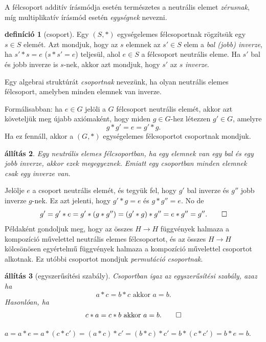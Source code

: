 \documentclass[a4paper, showtrims]{memoir}
\makeatletter
\renewenvironment{proof}[1][\proofname]
    {\par\pushQED{\qed}%
    \normalfont \topsep6\p@\@plus6\p@\relax
    \trivlist
    \item[\hskip\labelsep
        \itshape
    #1\@addpunct{:}]\ignorespaces}
    {\popQED\endtrivlist\@endpefalse}
\theoremstyle{plain}
\newtheorem{proposition}{állítás}[chapter]
\theoremstyle{remark}
\theoremstyle{definition}
\newtheorem{definition}[proposition]{definíció}
\makeatother
\begin{document}
A félcsoport additív írásmódja esetén természetes a neutrális elemet \emph{zérusnak},
míg multiplikatív írásmód esetén \emph{egységnek} nevezni.
\begin{definition}[csoport]
    Egy $\left( S,\ast \right)$ egységelemes félcsoportnak rögzítsük egy $s\in S$ elemét.
    Azt mondjuk, hogy az $s$ elemnek az $s'\in S$ elem a \emph{bal (jobb) inverze},
    ha $s'\ast s=e$ ($s\ast s'=e$) teljesül,
    ahol $e\in S$ a félcsoport neutrális eleme.
    Ha $s'$ bal és jobb inverze is $s$-nek, akkor azt mondjuk, hogy $s'$ az $s$ \emph{inverze}.
    
    Egy algebrai struktúrát \emph{csoportnak} nevezünk,
    ha olyan neutrális elemes félcsoport, amelyben minden elemnek van inverze.
\end{definition}
Formálisabban: ha $e\in G$ jelöli a $G$ félcsoport neutrális elemét,
    akkor azt követeljük meg újabb axiómaként, 
    hogy miden $g\in G$-hez létezzen $g'\in G$, amelyre
	\[
		g\ast g'=e=g'\ast g.\tag{\dag}
	\]
    Ha ez fennáll, akkor a $(G,\ast)$ egységelemes félcsoportot csoportnak mondjuk.
\begin{proposition}
    Egy neutrális elemes félcsoportban, 
    ha egy elemnek van egy bal és egy jobb inverze,
    akkor ezek megegyeznek.
    Emiatt egy csoportban minden elemnek csak egy inverze van.
\end{proposition}
\begin{proof}
	Jelölje $e$ a csoport neutrális elemét,
	és tegyük fel, hogy $g'$ bal inverze és $g''$ jobb inverze $g$-nek.
	Ez azt jelenti, 
    hogy $g'\ast g=e$ és $g\ast g''=e$.
    No de
	\[
		g'=g'\ast e=
		g'\ast\left( g\ast g'' \right)=
		\left(g'\ast g\right)\ast g'' =
		e\ast g''=g''.\qedhere
	\]
\end{proof}
Példaként gondoljuk meg, hogy az összes $H\to H$ függvények halmaza a kompozíció művelettel
neutrális elemes félcsoportot,
és az összes $H\to H$ kölcsönösen egyértelmű függvények halmaza a kompozíció művelettel csoportot alkotnak.
Ez utóbbi csoportot mondjuk \emph{permutáció csoportnak}.
\begin{proposition}[egyszerűsítési szabály]
	Csoportban igaz az egyszerűsítési szabály, azaz ha
	\[
        a\ast c=b\ast c\text{ akkor } a=b.
	\]
    Hasonlóan, ha
	\[
        c\ast a=c\ast b\text{ akkor } a=b.\qedhere
	\]
\end{proposition}
\begin{proof}
	\begin{math}
		a=a\ast e
		=
		a\ast \left( c\ast c'\right)=
		\left( a\ast c \right)\ast c'=
		\left( b\ast c \right)\ast c'=
		b\ast\left( c\ast c' \right)=
		b\ast e=
		b.
	\end{math}
\end{proof}
\end{document}
